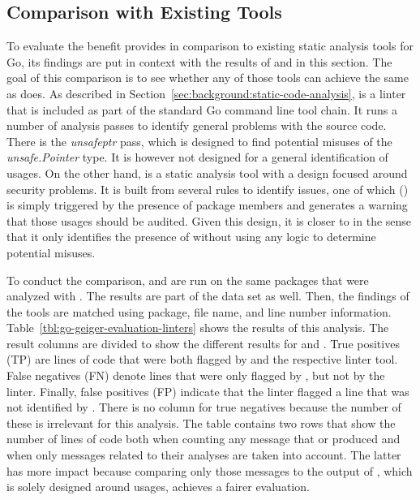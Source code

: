 
\subsection{Comparison with Existing Tools}\label{subsec:go-geiger:evaluation:linters-comparison}

To evaluate the benefit \toolGeiger{} provides in comparison to existing static analysis tools for Go, its findings are
put in context with the results of \toolVet{} and \toolGosec{} in this section.
The goal of this comparison is to see whether any of those tools can achieve the same as \toolGeiger{} does.
As described in Section~\ref{sec:background:static-code-analysis}, \toolVet{} is a linter that is included as part of
the standard Go command line tool chain.
It runs a number of analysis passes to identify general problems with the source code.
There is the \textit{unsafeptr} pass, which is designed to find potential misuses of the \textit{unsafe.Pointer} type.
It is however not designed for a general identification of \unsafe{} usages.
On the other hand, \toolGosec{} is a static analysis tool with a design focused around security problems.
It is built from several rules to identify issues, one of which (\textit{}) is simply triggered by the
presence of \unsafe{} package members and generates a warning that those usages should be audited.
Given this design, it is closer to \toolGeiger{} in the sense that it only identifies the presence of \unsafe{} without
using any logic to determine potential misuses.

To conduct the comparison, \toolVet{} and \toolGosec{} are run on the same \packagesAnalyzed{} packages that were
analyzed with \toolGeiger{}.
The results are part of the data set as well.
Then, the findings of the tools are matched using package, file name, and line number information.
Table~\ref{tbl:go-geiger-evaluation-linters} shows the results of this analysis.
The result columns are divided to show the different results for \toolVet{} and \toolGosec{}.
True positives (TP) are lines of code that were both flagged by \toolGeiger{} and the respective linter tool.
False negatives (FN) denote lines that were only flagged by \toolGeiger{}, but not by the linter.
Finally, false positives (FP) indicate that the linter flagged a line that was not identified by \toolGeiger{}.
There is no column for true negatives because the number of these is irrelevant for this analysis.
The table contains two rows that show the number of lines of code both when counting any message that \toolVet{} or
\toolGosec{} produced and when only messages related to their \unsafe{} analyses are taken into account.
The latter has more impact because comparing only those messages to the output of \toolGeiger{}, which is solely
designed around \unsafe{} usages, achieves a fairer evaluation.

